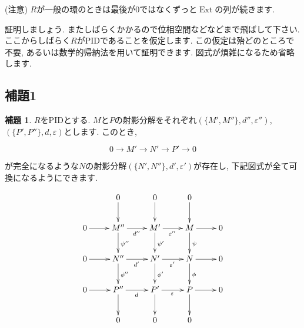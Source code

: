 \documentclass{jsarticle}
\newcommand{\makeop}[1]{\mathop{\mathrm{#1}}\nolimits}
\def\Ext{\makeop{Ext}}
\theoremstyle{definition}
\newtheorem{lemma}{補題}
\numberwithin{theorem}{section}
\begin{document}
(注意) $R$が一般の環のときは最後が$0$ではなくずっと$\Ext$の列が続きます.

証明しましょう. またしばらくかかるので位相空間などなどまで飛ばして下さい. ここからしばらく$R$がPIDであることを仮定します.
この仮定は殆どのところで不要, あるいは数学的帰納法を用いて証明できます. 図式が煩雑になるため省略します.

\subsection{補題1}
\begin{lemma}
$R$をPIDとする. $M$と$P$の射影分解をそれぞれ$(\{M', M''\}, d'', \varepsilon'')$, $(\{P', P''\}, d, \varepsilon)$とします.
このとき, 

\begin{equation*}
0\rightarrow M' \rightarrow N' \rightarrow P' \rightarrow 0
\end{equation*}

が完全になるような$N$の射影分解$(\{N', N''\}, d', \varepsilon')$が存在し, 下記図式が全て可換になるようにできます.

\begin{equation*}
\xymatrix{
            & 0 \ar[d] &  0 \ar[d] &  0 \ar[d] & \\
  0 \ar[r] & M'' \ar[r]_{d''} \ar[d]^{\psi''} & M' \ar[r]_{\varepsilon''} \ar[d]^{\psi'} & M \ar[r] \ar[d]^{\psi} & 0 \\
  0 \ar[r] & N'' \ar[r]_{d'} \ar[d]^{\phi''} & N' \ar[r]_{\varepsilon'} \ar[d]^{\phi'} & N \ar[r] \ar[d]^{\phi} & 0 \\
  0 \ar[r] & P'' \ar[r]_{d} \ar[d] & P' \ar[r]_{\varepsilon} \ar[d] & P \ar[r] \ar[d] & 0 \\
            & 0 &  0 &  0 & \\
}
\end{equation*}
\end{lemma}
\end{document}
